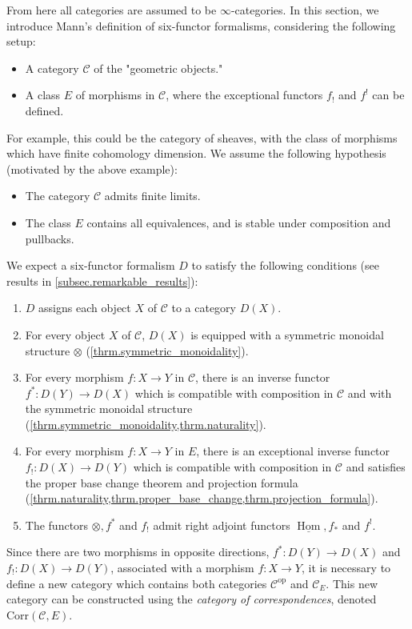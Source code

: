 \documentclass[a4paper,dvipdfmx,11pt,reqno]{amsart}
\DeclareMathOperator{\Hom}{Hom}
\DeclareMathOperator{\myop}{op}
\newcommand{\C}{\mathcal{C}}
\newcommand{\Corr}{\mathrm{Corr}}
\theoremstyle{definition}
\begin{document}
From here all categories are assumed to be $\infty$-categories.
In this section, we introduce Mann's definition of six-functor formalisms, considering the following setup:
\begin{itemize}
  \item A category $\C$ of the "geometric objects."
  \item A class $E$ of morphisms in $\C$, where the exceptional functors $f_{!}$ and $f^{!}$ can be defined.
\end{itemize}
For example, this could be the category of sheaves, with the class of morphisms which have finite cohomology dimension.
We assume the following hypothesis (motivated by the above example):
\begin{itemize}
  \item The category $\C$ admits finite limits.
  \item The class $E$ contains all equivalences, and is stable under composition and pullbacks.
\end{itemize}
We expect a six-functor formalism $D$ to satisfy the following conditions (see results in \cref{subsec.remarkable_results}):
\begin{enumerate}
  \item $D$ assigns each object $X$ of $\C$ to a category $D(X)$.
  \item For every object $X$ of $\C$, $D(X)$ is equipped with a symmetric monoidal structure $\otimes$ (\cref{thrm.symmetric_monoidality}).
  \item For every morphism $f : X \to Y$ in $\C$, there is an inverse functor $f^{*} : D(Y) \to D(X)$ which is compatible with composition in $\C$ and with the symmetric monoidal structure (\cref{thrm.symmetric_monoidality,thrm.naturality}).
  \item For every morphism $f : X \to Y$ in $E$, there is an exceptional inverse functor $f_{!} : D(X) \to D(Y)$ which is compatible with composition in $\C$ and satisfies the proper base change theorem and projection formula (\cref{thrm.naturality,thrm.proper_base_change,thrm.projection_formula}).
  \item The functors $\otimes, f^{*}$ and $f_{!}$ admit right adjoint functors $\underline{\Hom}, f_{*}$ and $f^{!}$.
\end{enumerate}
Since there are two morphisms in opposite directions, $f^{*} : D(Y) \to D(X)$ and $f_{!} : D(X) \to D(Y)$, associated with a morphism $f : X \to Y$, it is necessary to define a new category which contains both categories $\C^{\myop}$ and $\C_{E}$.
This new category can be constructed using the \textit{category of correspondences}, denoted $\Corr(\C,E)$.
 
\end{document}
